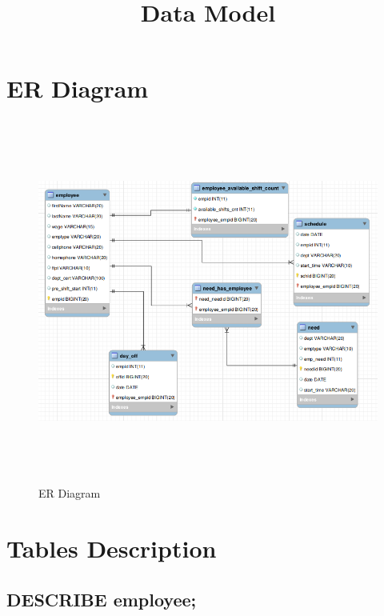 \documentclass{article} %
\title{Data Model}
\begin{document}
\maketitle




\section{ER Diagram}

\begin{figure}[H]
	\includegraphics[height=12cm, width=16cm]{data_model.png}
	\caption{ER Diagram}
\end{figure}


\section{Tables Description}


\subsection*{DESCRIBE employee;}
\end{document}
